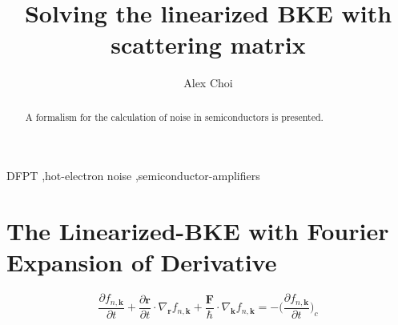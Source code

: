 \documentclass[preprint,12pt]{elsarticle}
\begin{document}
\begin{frontmatter}


\title{Solving the linearized BKE with scattering matrix}




\author{Alex Choi}

\address{California Institute of Technology}

\begin{abstract}
A formalism for the calculation of noise in semiconductors is presented.
\end{abstract}

\begin{keyword}
DFPT \sep hot-electron noise \sep semiconductor-amplifiers


\end{keyword}

\end{frontmatter}


\section{The Linearized-BKE with Fourier Expansion of Derivative}
\label{S:1}

\begin{equation}\label{linearized_BKE}
    \frac{\partial f_{n,\mathbf{k}}}{\partial t} + \frac{\partial \mathbf{r}}{\partial t} \cdot \nabla_{\mathbf{r}} f_{n,\mathbf{k}} + \frac{\mathbf{F}}{\hbar} \cdot \nabla_{\mathbf{k}} f_{n,\mathbf{k}} = -\bigg(\frac{\partial f_{n,\mathbf{k}}}{\partial t}\bigg)_{c}
\end{equation}
\end{document}
